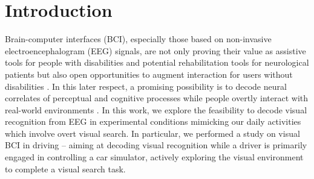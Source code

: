 \documentclass[12pt]{iopart}
\begin{document}
\section{Introduction}
\label{sec:intro}


Brain-computer interfaces (BCI), especially those based on 
non-invasive electroencephalogram (EEG) signals, are not only
proving their value as assistive tools for people 
with disabilities
\cite{birbaumer_spelling_1999,wolpaw_control_2004,holz_braincomputer_2013,leeb_towards_2015,saeedi_long-term_2017,perdikis_cybathlon_2018}
and potential rehabilitation tools for
neurological patients
\cite{ramos-murguialday_brain-machine-interface_2013,pichiorri_braincomputer_2015,biasiucci_brain-actuated_2018,cervera_braincomputer_2018}
but also open opportunities 
to augment interaction for users without disabilities \cite{zhang_eeg-based_2015,khaliliardali_action_2015,chavarriaga_decoding_2018}. In this
later respect, a promising possibility is to decode neural
correlates of perceptual and cognitive processes while people
overtly interact with real-world environments
\cite{uscumlic_iterative_2013,jangraw_neurally_2014,haufe_electrophysiology-based_2014}.
In this work, we explore the feasibility to decode visual recognition
from EEG in experimental conditions mimicking our
daily activities which involve overt visual search. In particular,
we performed a study on visual BCI in
driving -- aiming at decoding visual recognition
while a driver is primarily engaged in controlling a car simulator,
actively exploring the visual environment to complete a visual search task.
\end{document}
